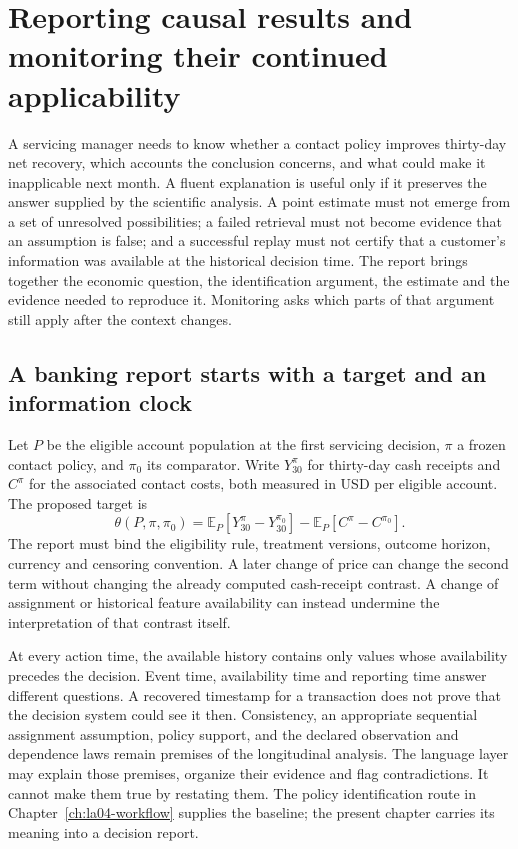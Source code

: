 \chapter{Reporting causal results and monitoring their continued applicability}
\label{exec16:reporting}

A servicing manager needs to know whether a contact policy improves thirty-day
net recovery, which accounts the conclusion concerns, and what could make it
inapplicable next month. A fluent explanation is useful only if it preserves the
answer supplied by the scientific analysis. A point estimate must not emerge
from a set of unresolved possibilities; a failed retrieval must not become
evidence that an assumption is false; and a successful replay must not certify
that a customer's information was available at the historical decision time.
The report brings together the economic question, the identification
argument, the estimate and the evidence needed to reproduce it. Monitoring asks which parts of that argument still apply after the
context changes.

\section{A banking report starts with a target and an information clock}

Let \(P\) be the eligible account population at the first servicing decision,
\(\pi\) a frozen contact policy, and \(\pi_0\) its comparator. Write
\(Y_{30}^{\pi}\) for thirty-day cash receipts and \(C^\pi\) for the associated
contact costs, both measured in USD per eligible account. The proposed target is
\[
 \theta(P,\pi,\pi_0)
   =\mathbb E_P[Y_{30}^{\pi}-Y_{30}^{\pi_0}]
     -\mathbb E_P[C^\pi-C^{\pi_0}].
\]
The report must bind the eligibility rule, treatment versions, outcome horizon,
currency and censoring convention. A later change of price can change the second
term without changing the already computed cash-receipt contrast. A change of
assignment or historical feature availability can instead undermine the
interpretation of that contrast itself.

At every action time, the available history contains only values whose
availability precedes the decision. Event time, availability time and reporting
time answer different questions. A recovered timestamp for a transaction does
not prove that the decision system could see it then. Consistency, an
appropriate sequential assignment assumption, policy support, and the declared
observation and dependence laws remain premises of the longitudinal analysis.
The language layer may explain those premises, organize their evidence and flag
contradictions. It cannot make them true by restating them. The policy
identification route in Chapter~\ref{ch:la04-workflow} supplies the baseline;
the present chapter carries its meaning into a decision report.

